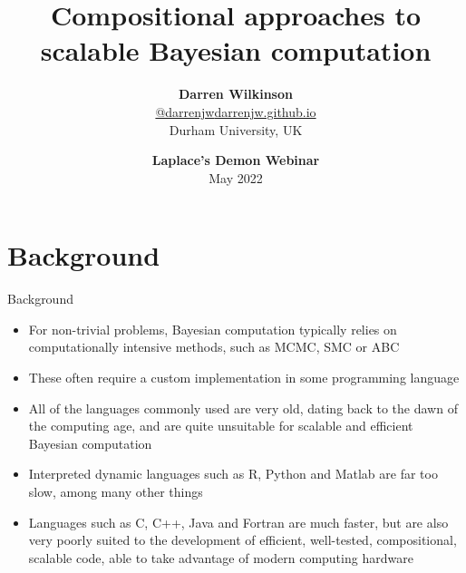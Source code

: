 \documentclass[mathserif,handout]{beamer}
\begin{document}
\title{Compositional approaches to scalable Bayesian computation}
\author{\textbf{\large Darren Wilkinson} \\
\url{@darrenjw}\hfill \alert{\url{darrenjw.github.io}}\\
\vspace{2ex}%
Durham University, UK}
\date{\textbf{Laplace's Demon Webinar}\\May 2022}

  
\frame{\titlepage}




\section{Background}

\begin{frame}{Background}
\protect\hypertarget{background}{}

\begin{itemize}

\item
  For non-trivial problems, Bayesian computation typically relies on
  computationally intensive methods, such as MCMC, SMC or ABC
\item
  These often require a custom implementation in some programming
  language
\item
  All of the languages commonly used are very old, dating back to the
  dawn of the computing age, and are quite unsuitable for scalable and
  efficient Bayesian computation
\item
  Interpreted dynamic languages such as R, Python and Matlab are far too
  slow, among many other things
\item
  Languages such as C, C++, Java and Fortran are much faster, but are
  also very poorly suited to the development of efficient, well-tested, compositional,
  scalable code, able to take advantage of modern computing hardware
\end{itemize}

\end{frame}
\end{document}
